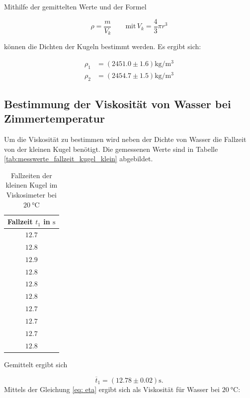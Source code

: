 Mithilfe der gemittelten Werte und der Formel

\begin{equation*}
\rho=\frac{m}{V_{k}} \qquad \text{mit} \, V_{k}=\frac{4}{3}\pi r^3
\end{equation*}

können die Dichten der Kugeln bestimmt werden.
Es ergibt sich:

\begin{align*}
\rho_{1}&=\left(\num{2451.0}\pm\num{1.6}\right) \si{\kilogram\per\cubic\meter}\\
\rho_{2}&=\left(\num{2454.7}\pm\num{1.5}\right) \si{\kilogram\per\cubic\meter}
\end{align*}

\subsection{Bestimmung der Viskosität von Wasser bei Zimmertemperatur} \label{sec:visko}
Um die Viskosität zu bestimmen wird neben der Dichte von Wasser die Fallzeit von der kleinen Kugel benötigt.
Die gemessenen Werte sind in Tabelle \ref{tab:messwerte_fallzeit_kugel_klein} abgebildet. 
\begin{table}
\centering
\begin{tabular} {c}
	\toprule
  Fallzeit $t_1$ in $\si{\second}$ \\
  \midrule
  $\num{12.7}$ \\
  $\num{12.8}$ \\
  $\num{12.9}$ \\
  $\num{12.8}$ \\
  $\num{12.8}$ \\
  $\num{12.8}$ \\
  $\num{12.7}$ \\
  $\num{12.7}$ \\
  $\num{12.7}$ \\
  $\num{12.8}$ \\
\bottomrule
\end{tabular}
\caption{Fallzeiten der kleinen Kugel im Viskosimeter bei $\SI{20}{\degreeCelsius}$}
\end{table}

Gemittelt ergibt sich

\begin{equation}
\label{eq:gemittelte_fallzeit_klein}
\overline{t}_{1}=\left(\num{12.78}\pm\num{0.02}\right) \si{\second}.
\end{equation}
Mittels der Gleichung \eqref{eq: eta} ergibt sich als Viskosität
für Wasser bei $\SI{20}{\degreeCelsius}$:

